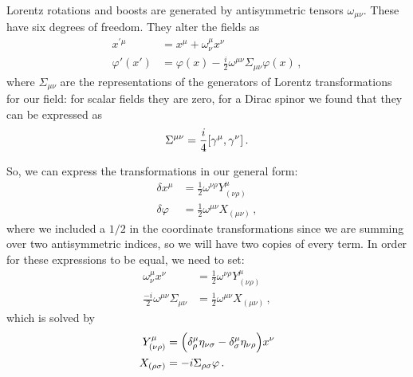 \documentclass[main.tex]{subfiles}
\begin{document}
Lorentz rotations and boosts are generated by antisymmetric tensors \(\omega_{\mu \nu  }\). These have six degrees of freedom. They alter the fields as 
%
\begin{subequations}
\begin{align}
x^{\prime \mu } &= x^{\mu } + \omega^{\mu }_{\nu }x^{\nu }  \\
\varphi '(x') &= \varphi (x) - \frac{i}{2} \omega^{\mu \nu } \Sigma_{\mu \nu } \varphi (x)
\,,
\end{align}
\end{subequations}
%
where \(\Sigma_{\mu \nu }\) are the representations of the generators of Lorentz transformations for our field: for scalar fields they are zero, for a Dirac spinor we found that they can be expressed as 
%
\begin{align}
\Sigma^{\mu \nu } = \frac{i}{4} \qty[\gamma^{\mu }, \gamma^{\nu }]
\,.
\end{align}

So, we can express the transformations in our general form:
%
\begin{subequations}
\begin{align}
\delta x^{\mu } &= \frac{1}{2} \omega^{\nu \rho } Y^{\mu }_{(\nu \rho )}  \\
\delta \varphi  &= \frac{1}{2} \omega^{\mu \nu } X_{(\mu \nu )}
\,,
\end{align}
\end{subequations}
%
where we included a \(1/2\) in the coordinate transformations since we are summing over two antisymmetric indices, so we will have two copies of every term. In order for these expressions to be equal, we need to set: 
%
\begin{subequations}
\begin{align}
\omega^{\mu }_{\nu }x^{\nu } &= \frac{1}{2} \omega^{\nu \rho } Y^{\mu }_{(\nu \rho )}  \\
\frac{-i}{2} \omega^{\mu \nu } \Sigma_{\mu \nu } &=\frac{1}{2} \omega^{\mu \nu } X_{(\mu \nu )}
\,,
\end{align}
\end{subequations}
%
which is solved by 
%
\begin{subequations}
\begin{align}
Y^{\mu }_{(\nu \rho )} &= \qty(\delta ^{\mu }_{\rho } \eta_{\nu \sigma } - \delta ^{\mu }_{\sigma } \eta_{\nu \rho })x^{\nu }  \\
X_{(\rho \sigma )} &= -i \Sigma_{\rho \sigma }
\varphi 
\,.
\end{align}
\end{subequations}
\end{document}
